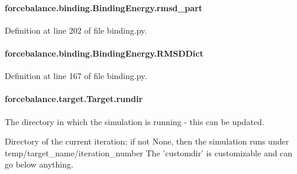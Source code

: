 \hypertarget{classforcebalance_1_1binding_1_1BindingEnergy_a9503044f7d14bfd9f8dc98dbe7950685}{
\paragraph[{rmsd\-\_\-part}]{\setlength{\rightskip}{0pt plus 5cm}forcebalance.\-binding.\-Binding\-Energy.\-rmsd\-\_\-part}}\label{classforcebalance_1_1binding_1_1BindingEnergy_a9503044f7d14bfd9f8dc98dbe7950685}


Definition at line 202 of file binding.\-py.

\hypertarget{classforcebalance_1_1binding_1_1BindingEnergy_a5f2f2a25d42e1b27f17fa7b289f0dd26}{
\paragraph[{R\-M\-S\-D\-Dict}]{\setlength{\rightskip}{0pt plus 5cm}forcebalance.\-binding.\-Binding\-Energy.\-R\-M\-S\-D\-Dict}}\label{classforcebalance_1_1binding_1_1BindingEnergy_a5f2f2a25d42e1b27f17fa7b289f0dd26}


Definition at line 167 of file binding.\-py.

\hypertarget{classforcebalance_1_1target_1_1Target_a6872de5b2d4273b82336ea5b0da29c9e}{
\paragraph[{rundir}]{\setlength{\rightskip}{0pt plus 5cm}forcebalance.\-target.\-Target.\-rundir\hspace{0.3cm}{\ttfamily [inherited]}}}\label{classforcebalance_1_1target_1_1Target_a6872de5b2d4273b82336ea5b0da29c9e}


The directory in which the simulation is running -\/ this can be updated. 

Directory of the current iteration; if not None, then the simulation runs under temp/target\-\_\-name/iteration\-\_\-number The 'customdir' is customizable and can go below anything.

